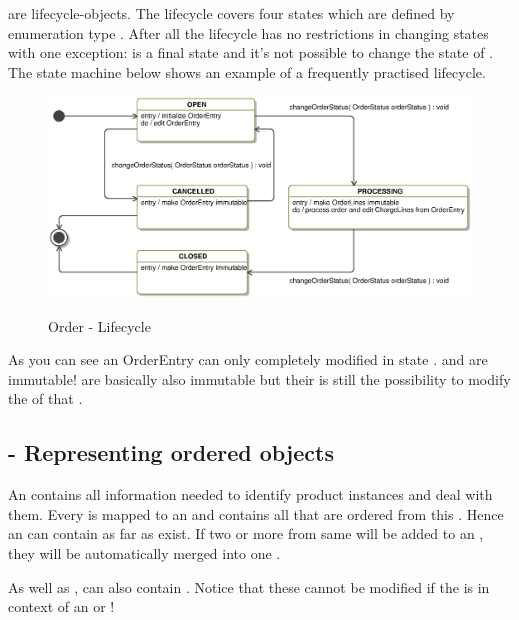  are lifecycle-objects. The lifecycle covers four states which are defined by enumeration type . After all the lifecycle has no restrictions in changing states with one exception:  is a final state and it's not possible to change the state of  . The state machine below shows an example of a frequently practised lifecycle.

\begin{figure}[ht]
	\centering
  \includegraphics[scale =.7]{images/OrderEntryState.eps}
	\label{order_statemachine}
	\caption{Order - Lifecycle}
\end{figure}  

As you can see an OrderEntry can only completely modified in state .  and   are immutable!   are basically also immutable but their is still the possibility to modify the  of that . 

\subsection{ - Representing ordered objects}
An  contains all information needed to identify product instances and deal with them. Every  is mapped to an  and contains all  that are ordered from this . Hence an  can contain as far  as  exist. If two or more  from same  will be added to an , they will be automatically merged into one .

As well as ,  can also contain . Notice that these  cannot be modified if the  is in context of an  or  ! 

